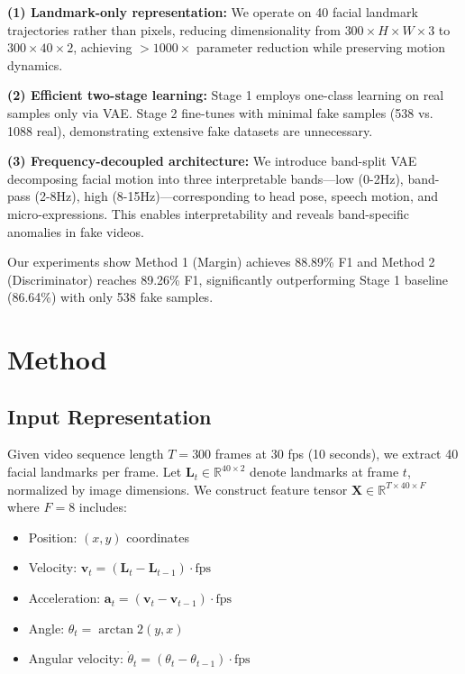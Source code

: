 \documentclass[10pt,twocolumn,letterpaper]{article}
\begin{document}
\textbf{(1) Landmark-only representation:} We operate on 40 facial landmark trajectories rather than pixels, reducing dimensionality from $300 \times H \times W \times 3$ to $300 \times 40 \times 2$, achieving $>1000\times$ parameter reduction while preserving motion dynamics.

\textbf{(2) Efficient two-stage learning:} Stage 1 employs one-class learning on real samples only via VAE. Stage 2 fine-tunes with minimal fake samples (538 vs. 1088 real), demonstrating extensive fake datasets are unnecessary.

\textbf{(3) Frequency-decoupled architecture:} We introduce band-split VAE decomposing facial motion into three interpretable bands—low (0-2Hz), band-pass (2-8Hz), high (8-15Hz)—corresponding to head pose, speech motion, and micro-expressions. This enables interpretability and reveals band-specific anomalies in fake videos.

Our experiments show Method 1 (Margin) achieves 88.89\% F1 and Method 2 (Discriminator) reaches 89.26\% F1, significantly outperforming Stage 1 baseline (86.64\%) with only 538 fake samples.

\section{Method}

\subsection{Input Representation}

Given video sequence length $T=300$ frames at 30 fps (10 seconds), we extract 40 facial landmarks per frame. Let $\mathbf{L}_t \in \mathbb{R}^{40 \times 2}$ denote landmarks at frame $t$, normalized by image dimensions. We construct feature tensor $\mathbf{X} \in \mathbb{R}^{T \times 40 \times F}$ where $F=8$ includes:
\begin{itemize}
\itemsep0em
    \item Position: $(x, y)$ coordinates
    \item Velocity: $\mathbf{v}_t = (\mathbf{L}_t - \mathbf{L}_{t-1}) \cdot \text{fps}$
    \item Acceleration: $\mathbf{a}_t = (\mathbf{v}_t - \mathbf{v}_{t-1}) \cdot \text{fps}$
    \item Angle: $\theta_t = \arctan2(y, x)$
    \item Angular velocity: $\dot{\theta}_t = (\theta_t - \theta_{t-1}) \cdot \text{fps}$
\end{itemize}
\end{document}
